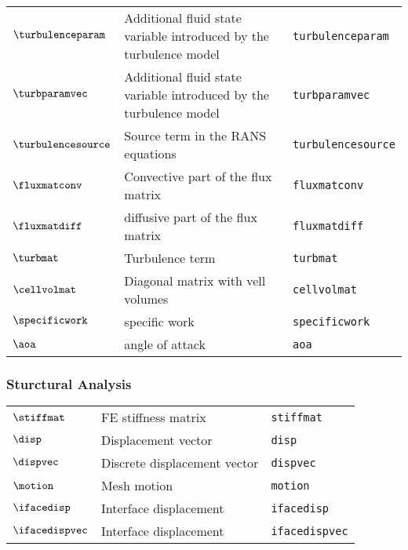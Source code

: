 \begin{tabular}{l l l}
$\turbulenceparam$ & Additional fluid state variable introduced by the turbulence model& \texttt{turbulenceparam}\\
$\turbparamvec$ & Additional fluid state variable introduced by the turbulence model& \texttt{turbparamvec}\\
$\turbulencesource$ & Source term in the \ac{RANS} equations& \texttt{turbulencesource}\\
$\fluxmatconv$ & Convective part of the flux matrix& \texttt{fluxmatconv}\\
$\fluxmatdiff$ & diffusive part of the flux matrix& \texttt{fluxmatdiff}\\
$\turbmat$ & Turbulence term& \texttt{turbmat}\\
$\cellvolmat$ & Diagonal matrix with vell volumes& \texttt{cellvolmat}\\
$\specificwork$ & specific work& \texttt{specificwork}\\
$\aoa$ & angle of attack& \texttt{aoa}\\
\end{tabular}

\subsubsection*{Sturctural Analysis}
\begin{tabular}{l l l}
$\stiffmat$ & \ac{FE} stiffness matrix& \texttt{stiffmat}\\
$\disp$ & Displacement vector& \texttt{disp}\\
$\dispvec$ & Discrete displacement vector& \texttt{dispvec}\\
$\motion$ & Mesh motion& \texttt{motion}\\
$\ifacedisp$ & Interface displacement& \texttt{ifacedisp}\\
$\ifacedispvec$ & Interface displacement& \texttt{ifacedispvec}\\
\end{tabular}

